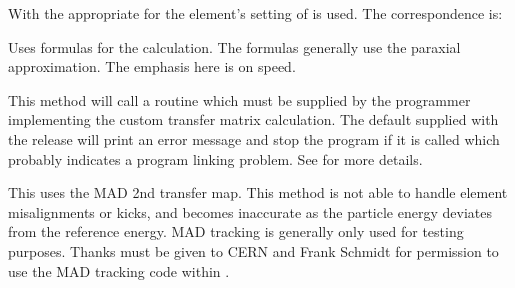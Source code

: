 \begin{description}

\item[\vn{Auto}]
With  the  appropriate for the element's setting of
 is used. The correspondence is:
\begin{table}[pth]
\caption[Actual  used with  setting.]{Actual  used when
when the  is set to .}
\end{table}

\item[\vn{Bmad_Standard}]
Uses formulas for the calculation. The formulas generally use the paraxial approximation. The
emphasis here is on speed.

\item[\vn{Custom}]
This method will call a routine  which must be supplied by the programmer
implementing the custom transfer matrix calculation. The default  supplied with
the \bmad release will print an error message and stop the program if it is called which probably
indicates a program linking problem.  See  for more details.

\item[\vn{MAD}]
This uses the MAD 2nd transfer map. This method is not able to handle element misalignments or
kicks, and becomes inaccurate as the particle energy deviates from the reference energy. MAD
tracking is generally only used for testing purposes. Thanks must be given to CERN and Frank Schmidt
for permission to use the MAD tracking code within \bmad.


\end{description}
